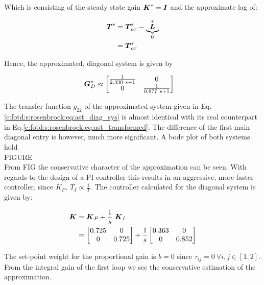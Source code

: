 Which is consisting of the steady state gain $\mbox{\boldmath$K$}^* = \mbox{\boldmath$I$}$ and the approximate lag of:

\begin{align}
\begin{split}
\mbox{\boldmath$T$}^* & = \mbox{\boldmath$T$}_{ar}^* - \underbrace{{\mbox{\boldmath$L$}}}_{0}^* \\
&= \mbox{\boldmath$T$}_{ar}^*
\end{split}
\label{c:fotd:s:rosenbrock:eq:ast_lag_approx}
\end{align}

Hence, the approximated, diagonal system is given by 

\begin{align}
\begin{split}
\mbox{\boldmath$G$}_D^* &\approx \begin{bmatrix}
\frac{1}{2.330~s+1} & 0 \\
0 & \frac{1}{0.977~s+1}
\end{bmatrix}
\end{split}
\label{c:fotd:s:rosenbrock:eq:ast_diag_sys}
\end{align}

The transfer function $g_{22}$ of the approximated system given in Eq.\ref{c:fotd:s:rosenbrock:eq:ast_diag_sys} is almost identical with its real counterpart in Eq.\ref{c:fotd:s:rosenbrock:eq:ast_transformed}. The difference of the first main diagonal entry is however, much more significant. A bode plot of both systems hold\\

FIGURE\\

From FIG the conservative character of the approximation can be seen. With regards to the design of a PI controller this results in an aggressive, more faster controller, since $K_P,~T_I \propto \frac{1}{T}$. The controller calculated for the diagonal system is given by:

\begin{align}
\mbox{\boldmath$K$} &= \mbox{\boldmath$K$}_P + \frac{1}{s}~ \mbox{\boldmath$K$}_I\\
&= \begin{bmatrix}
0.725 & 0 \\
0 & 0.725
\end{bmatrix}
+ \frac{1}{s}\begin{bmatrix}
0.363 & 0 \\
0 & 0.852
\end{bmatrix}
\end{align}

 The set-point weight for the proportional gain is $b = 0$ since $\tau_{ij} = 0 ~\forall i,j \in [1,2]$. From the integral gain of the first loop we see the conservative estimation of the approximation.\\

